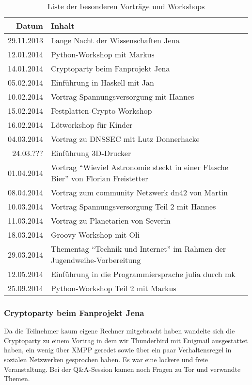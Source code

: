 \documentclass[10pt,DIV16]{scrartcl}
\begin{document}
\begin{table}[h]
\begin{tabular}{r|l}
	\textbf{Datum} & \textbf{Inhalt} \\ \hline{}
	29.11.2013 & Lange Nacht der Wissenschaften Jena \\
	12.01.2014 & Python-Workshop mit Markus \\
	14.01.2014 & Cryptoparty beim Fanprojekt Jena \\
	05.02.2014 & Einführung in Haskell mit Jan \\
	10.02.2014 & Vortrag Spannungsversorgung mit Hannes \\
	15.02.2014 & Festplatten-Crypto Workshop \\
	16.02.2014 & Lötworkshop für Kinder \\
	04.03.2014 & Vortrag zu DNSSEC mit Lutz Donnerhacke \\
	24.03.??? & Einführung 3D-Drucker \\
	01.04.2014 & Vortrag "`Wieviel Astronomie steckt in einer Flasche Bier"' von Florian Freistetter \\
	08.04.2014 & Vortrag zum community Netzwerk dn42 von Martin \\
	10.03.2014 & Vortrag Spannungsversorgung Teil 2 mit Hannes \\
	11.03.2014 & Vortrag zu Planetarien von Severin \\
	18.03.2014 & Groovy-Workshop mit Oli \\
	29.03.2014 & Thementag "`Technik und Internet"' im Rahmen der Jugendweihe-Vorbereitung \\
	12.05.2014 & Einführung in die Programmiersprache julia durch mk \\
	25.09.2014 & Python-Workshop Teil 2 mit Markus \\
	\end{tabular}
	\caption{Liste der besonderen Vorträge und Workshops}
\end{table}

\subsubsection{Cryptoparty beim Fanprojekt Jena}

Da die Teilnehmer kaum eigene Rechner mitgebracht haben wandelte sich die
Cryptoparty zu einem Vortrag in dem wir Thunderbird mit Enigmail ausgestattet
haben, ein wenig über XMPP geredet sowie über ein paar Verhaltensregel in
sozialen Netzwerken gesprochen haben. Es war eine lockere und freie
Veranstaltung. Bei der Q\&A-Session kamen noch Fragen zu Tor und verwandte
Themen.
\end{document}
